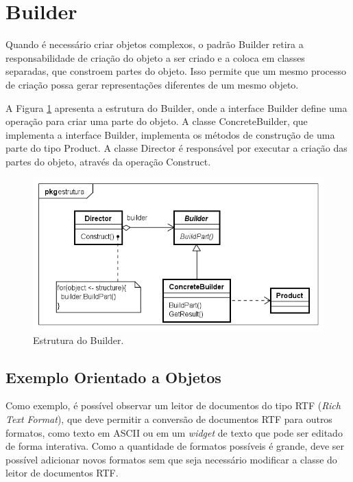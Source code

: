 \section{Builder}

Quando é necessário criar objetos  
complexos, o padrão Builder retira a 
responsabilidade de criação do objeto a 
ser criado e a coloca em classes separadas, 
que constroem partes do objeto. 
Isso permite que um mesmo processo de criação 
possa gerar representações diferentes de um mesmo 
objeto.\cite{gamma:1995}

A Figura \ref{builder_struct} apresenta 
a estrutura do Builder, onde a interface 
Builder define uma operação para criar uma 
parte do objeto. A classe ConcreteBuilder, que 
implementa a interface Builder, 
implementa os métodos de construção de 
uma parte do tipo Product. A classe Director 
é responsável por executar a criação das 
partes do objeto, através da operação 
Construct.

\begin{figure}[htb]
	\caption{\label{builder_struct}Estrutura do Builder.}
	\begin{center}
	    \includegraphics[scale=0.5]{5_padroes-contexto-funcional/5.1_criacionais/5.1.3_builder/builder_estrutura.png}
	\end{center}
\end{figure}

\subsection*{Exemplo Orientado a Objetos}

Como exemplo, é possível observar um leitor de 
documentos do tipo RTF (\textit{Rich Text Format}), 
que deve permitir a conversão de documentos RTF 
para outros formatos, como texto em ASCII ou em um 
\textit{widget} de texto que pode ser editado de 
forma interativa. Como a quantidade de formatos 
possíveis é grande, deve ser possível adicionar 
novos formatos sem que seja necessário modificar 
a classe do leitor de documentos RTF. 

